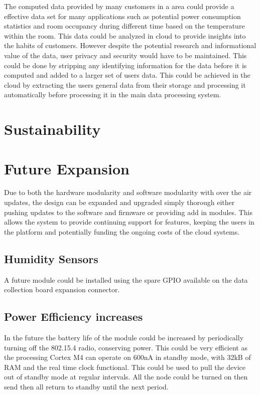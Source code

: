 \documentclass[12pt]{article}
\begin{document}
The computed data provided by many customers in a area could provide a effective data set for many
applications such as potential power consumption statistics and room occupancy during different
time based on the temperature within the room. This data could be analyzed in cloud to provide
insights into the habits of customers. However despite the potential research and informational
value of the data, user privacy and security would have to be maintained. This could be done by
stripping any identifying information for the data before it is computed and added to a larger set
of users data. This could be achieved in the cloud by extracting the users general data from their
storage and processing it automatically before processing it in the main data processing system.

\section{Sustainability}


\section{Future Expansion}
Due to both the hardware modularity and software modularity with over the air updates, the design
can be expanded and upgraded simply thorough either pushing updates to the software and firmware
or providing add in modules. This allows the system to provide continuing support for features,
keeping the users in the platform and potentially funding the ongoing costs of the cloud systems.

\subsection{Humidity Sensors}
A future module could be installed using the spare GPIO available on the data collection board
expansion connector.

\subsection{Power Efficiency increases}
In the future the battery life of the module could be increased by periodically turning off the
802.15.4 radio, conserving power. This could be very efficient as the processing Cortex M4 can
operate on 600nA in standby mode, with 32kB of RAM and the real time clock functional. This could
be used to pull the device out of standby mode at regular intervals. All the node could be turned
on then send then all return to standby until the next period.
\end{document}
